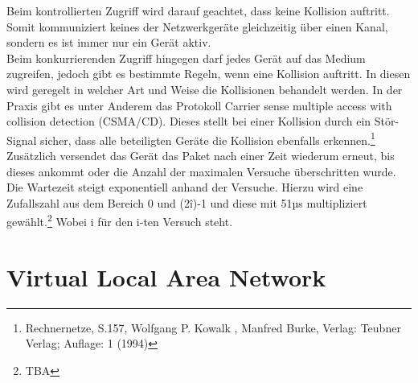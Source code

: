 Beim kontrollierten Zugriff wird darauf geachtet, dass keine Kollision auftritt. Somit kommuniziert keines der Netzwerkgeräte gleichzeitig über einen Kanal, sondern es ist immer nur ein Gerät aktiv.\\
Beim konkurrierenden Zugriff hingegen darf jedes Gerät auf das Medium zugreifen, jedoch gibt es bestimmte Regeln, wenn eine Kollision auftritt. In diesen wird geregelt in welcher Art und Weise die Kollisionen behandelt werden.
In der Praxis gibt es unter Anderem das Protokoll Carrier sense multiple access with collision detection (CSMA/CD).
Dieses stellt bei einer Kollision durch ein Stör-Signal sicher, dass alle beteiligten Geräte die Kollision ebenfalls erkennen.\footnote{Rechnernetze, S.157, Wolfgang P. Kowalk , Manfred Burke, Verlag: Teubner Verlag; Auflage: 1 (1994)}
Zusätzlich versendet das Gerät das Paket nach einer Zeit wiederum erneut, bis dieses ankommt oder die Anzahl der maximalen Versuche überschritten wurde. Die Wartezeit steigt exponentiell anhand der Versuche.
Hierzu wird eine Zufallszahl aus dem Bereich 0 und (2\^i)-1 und diese mit 51µs multipliziert gewählt.\footnote{TBA}
Wobei i für den i-ten Versuch steht.

\section{Virtual Local Area Network}
\label{sec:vlan}

